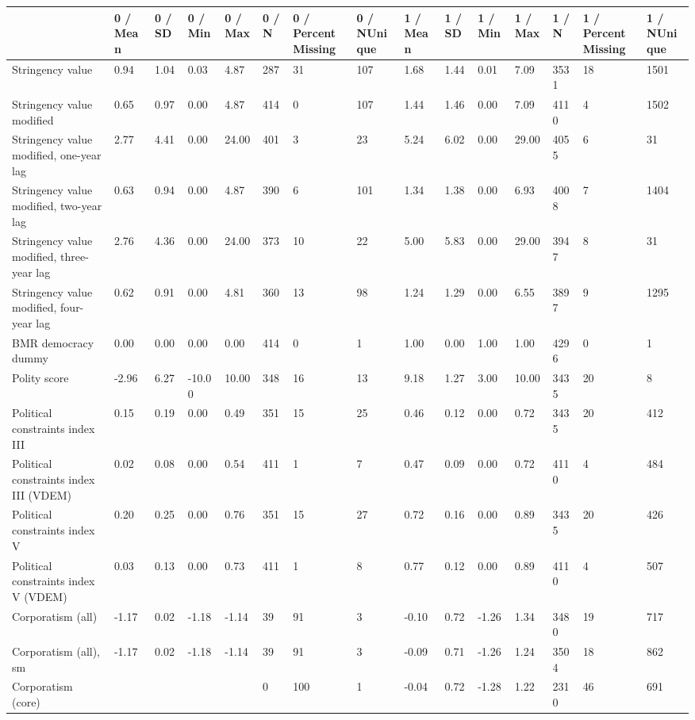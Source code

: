 
\begin{longtable}{lllllllllllllll}
\toprule
  & 0 / Mean & 0 / SD & 0 / Min & 0 / Max & 0 / N & 0 / PercentMissing & 0 / NUnique & 1 / Mean & 1 / SD & 1 / Min & 1 / Max & 1 / N & 1 / PercentMissing & 1 / NUnique\\
\midrule
Stringency value & 0.94 & 1.04 & 0.03 & 4.87 & 287 & 31 & 107 & 1.68 & 1.44 & 0.01 & 7.09 & 3531 & 18 & 1501\\
Stringency value modified & 0.65 & 0.97 & 0.00 & 4.87 & 414 & 0 & 107 & 1.44 & 1.46 & 0.00 & 7.09 & 4110 & 4 & 1502\\
Stringency value modified, one-year lag & 2.77 & 4.41 & 0.00 & 24.00 & 401 & 3 & 23 & 5.24 & 6.02 & 0.00 & 29.00 & 4055 & 6 & 31\\
Stringency value modified, two-year lag & 0.63 & 0.94 & 0.00 & 4.87 & 390 & 6 & 101 & 1.34 & 1.38 & 0.00 & 6.93 & 4008 & 7 & 1404\\
Stringency value modified, three-year lag & 2.76 & 4.36 & 0.00 & 24.00 & 373 & 10 & 22 & 5.00 & 5.83 & 0.00 & 29.00 & 3947 & 8 & 31\\
\addlinespace
Stringency value modified, four-year lag & 0.62 & 0.91 & 0.00 & 4.81 & 360 & 13 & 98 & 1.24 & 1.29 & 0.00 & 6.55 & 3897 & 9 & 1295\\
BMR democracy dummy & 0.00 & 0.00 & 0.00 & 0.00 & 414 & 0 & 1 & 1.00 & 0.00 & 1.00 & 1.00 & 4296 & 0 & 1\\
Polity score & -2.96 & 6.27 & -10.00 & 10.00 & 348 & 16 & 13 & 9.18 & 1.27 & 3.00 & 10.00 & 3435 & 20 & 8\\
Political constraints index III & 0.15 & 0.19 & 0.00 & 0.49 & 351 & 15 & 25 & 0.46 & 0.12 & 0.00 & 0.72 & 3435 & 20 & 412\\
Political constraints index III (VDEM) & 0.02 & 0.08 & 0.00 & 0.54 & 411 & 1 & 7 & 0.47 & 0.09 & 0.00 & 0.72 & 4110 & 4 & 484\\
\addlinespace
Political constraints index V & 0.20 & 0.25 & 0.00 & 0.76 & 351 & 15 & 27 & 0.72 & 0.16 & 0.00 & 0.89 & 3435 & 20 & 426\\
Political constraints index V (VDEM) & 0.03 & 0.13 & 0.00 & 0.73 & 411 & 1 & 8 & 0.77 & 0.12 & 0.00 & 0.89 & 4110 & 4 & 507\\
Corporatism (all) & -1.17 & 0.02 & -1.18 & -1.14 & 39 & 91 & 3 & -0.10 & 0.72 & -1.26 & 1.34 & 3480 & 19 & 717\\
Corporatism (all), sm & -1.17 & 0.02 & -1.18 & -1.14 & 39 & 91 & 3 & -0.09 & 0.71 & -1.26 & 1.24 & 3504 & 18 & 862\\
Corporatism (core) &  &  &  &  & 0 & 100 & 1 & -0.04 & 0.72 & -1.28 & 1.22 & 2310 & 46 & 691\\

\end{longtable}
